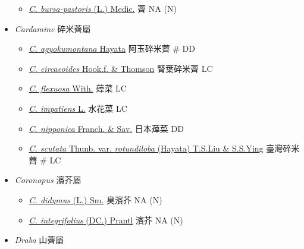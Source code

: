 \begin{itemize}
  \begin{itemize}
        \item[] \href{http://www.theplantlist.org/tpl1.1/search?q=Capsella+bursa-pastoris}{\textit{C. bursa-pastoris} (L.) Medic.}   薺   NA (N)
  \end{itemize}
 \item[] \textit{Cardamine} 碎米薺屬
                                
  \begin{itemize}
        \item[] \href{http://www.theplantlist.org/tpl1.1/search?q=Cardamine+agyokumontana}{\textit{C. agyokumontana} Hayata}   阿玉碎米薺  \# DD
        \item[] \href{http://www.theplantlist.org/tpl1.1/search?q=Cardamine+circaeoides}{\textit{C. circaeoides} Hook.f. \& Thomson}   腎葉碎米薺   LC
        \item[] \href{http://www.theplantlist.org/tpl1.1/search?q=Cardamine+flexuosa}{\textit{C. flexuosa} With.}   蔊菜   LC
        \item[] \href{http://www.theplantlist.org/tpl1.1/search?q=Cardamine+impatiens}{\textit{C. impatiens} L.}   水花菜   LC
        \item[] \href{http://www.theplantlist.org/tpl1.1/search?q=Cardamine+nipponica}{\textit{C. nipponica} Franch. \& Sav.}   日本蔊菜   DD
        \item[] \href{http://www.theplantlist.org/tpl1.1/search?q=Cardamine+scutata+var.+rotundiloba}{\textit{C. scutata} Thunb. var. \textit{rotundiloba} (Hayata) T.S.Liu \& S.S.Ying}   臺灣碎米薺  \# LC
  \end{itemize}
 \item[] \textit{Coronopus} 濱芥屬
                                
  \begin{itemize}
        \item[] \href{http://www.theplantlist.org/tpl1.1/search?q=Coronopus+didymus}{\textit{C. didymus} (L.) Sm.}   臭濱芥   NA (N)
        \item[] \href{http://www.theplantlist.org/tpl1.1/search?q=Coronopus+integrifolius}{\textit{C. integrifolius} (DC.) Prantl}   濱芥   NA (N)
  \end{itemize}
 \item[] \textit{Draba} 山薺屬
                                

\end{itemize}
